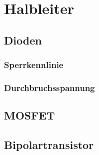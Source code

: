 \chapter{Halbleiter}

\section{Dioden}
\subsection{Sperrkennlinie}
\subsection{Durchbruchsspannung}

\section{MOSFET}

\section{Bipolartransistor}